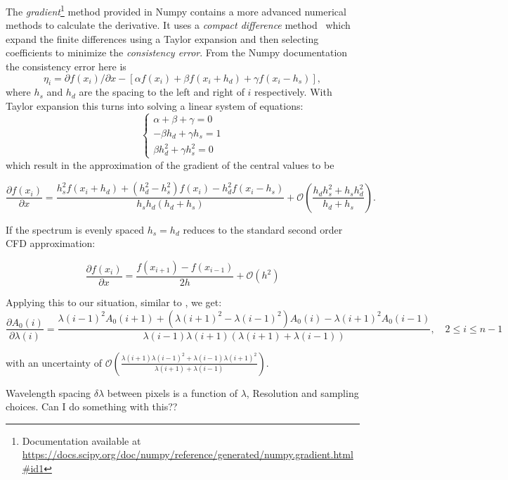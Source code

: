 The \emph{gradient}\footnote{Documentation available at \href{https://docs.scipy.org/doc/numpy/reference/generated/numpy.gradient.html\#id1 }{https://docs.scipy.org/doc/numpy/reference/generated/numpy.gradient.html\#id1}}  method provided in Numpy contains a more advanced numerical methods to calculate the derivative. It uses a \textit{compact difference} method~\citep{quarteroni_numerical_2000} which expand the finite differences using a Taylor expansion and then selecting coefficients to minimize the \textit{consistency error}.
From the Numpy documentation the consistency error here is \[\eta_i = \partial{f(x_i)}/\partial{x} -  [\alpha f(x_i) + \beta f(x_i +h_d) + \gamma f(x_i - h_s)],\] where \(h_s\) and \(h_d\) are the spacing to the left and right of \(i\) respectively.
With Taylor expansion this turns into solving a linear system of equations:
\[\begin{cases}
         \alpha + \beta + \gamma = 0\\
         -\beta h_d + \gamma h_s = 1\\
         \beta h_d^{2} + \gamma h_s^{2} = 0
    \end{cases}
\]
which result in the approximation of the gradient of the central values to be

\[\frac{\partial{f(x_i)}}{\partial{x}} = \frac{h_{s}^{2}f\left(x_{i} + h_{d}\right) + \left(h_{d}^{2} - h_{s}^{2}\right)f\left(x_{i}\right) - h_{d}^{2}f\left(x_{i}-h_{s}\right)} {h_{s}h_{d}\left(h_{d} + h_{s}\right)} + \mathcal{O}\left(\frac{h_{d}h_{s}^{2} + h_{s}h_{d}^{2}}{h_{d} + h_{s}}\right) \label{full_compact_difference}.\]

If the spectrum is evenly spaced $h_{s}=h_{d}$  reduces to the standard second order {CFD} approximation:

\[\frac{\partial{f(x_i)}}{\partial{x}} = \frac{f\left(x_{i+1}\right) - f\left(x_{i-1}\right)}{2h} + \mathcal{O}\left(h^{2}\right)\]


Applying this to our situation, similar to , we get:
\[\frac{\partial A_0(i)}{\partial\lambda(i)} = \frac{{\lambda(i-1)}^{2} A_0(i+1) + ({\lambda(i+1)}^{2}-{\lambda(i-1)}^{2}) A_0(i) - {\lambda(i+1)}^{2} A_0(i-1)} {\lambda(i-1)\lambda(i+1)(\lambda(i+1) + \lambda(i-1))}, \hspace{1em} 2 \leq i \leq n-1\]

with an uncertainty of \(\mathcal{O}\left(\frac{\lambda(i+1){\lambda(i-1)}^{2} + \lambda(i-1){\lambda(i+1)}^{2}}{\lambda(i+1) + \lambda(i-1)}\right)\).


{\red{} Wavelength spacing \(\delta\lambda\) between pixels is a function of \(\lambda\), Resolution and sampling choices. Can I do something with this??}

